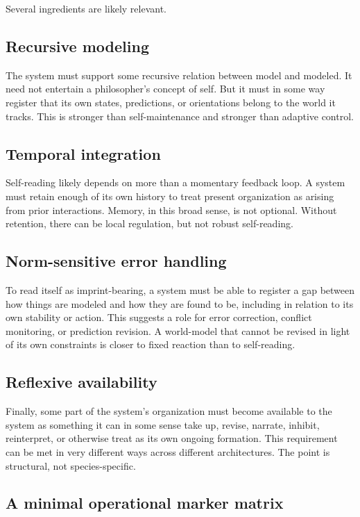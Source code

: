\documentclass[12pt]{article}
\begin{document}
Several ingredients are likely relevant.

\subsection{Recursive modeling}

The system must support some recursive relation between model and modeled. It need not entertain a philosopher's concept of self. But it must in some way register that its own states, predictions, or orientations belong to the world it tracks. This is stronger than self-maintenance and stronger than adaptive control.

\subsection{Temporal integration}

Self-reading likely depends on more than a momentary feedback loop. A system must retain enough of its own history to treat present organization as arising from prior interactions. Memory, in this broad sense, is not optional. Without retention, there can be local regulation, but not robust self-reading.

\subsection{Norm-sensitive error handling}

To read itself as imprint-bearing, a system must be able to register a gap between how things are modeled and how they are found to be, including in relation to its own stability or action. This suggests a role for error correction, conflict monitoring, or prediction revision. A world-model that cannot be revised in light of its own constraints is closer to fixed reaction than to self-reading.

\subsection{Reflexive availability}

Finally, some part of the system's organization must become available to the system as something it can in some sense take up, revise, narrate, inhibit, reinterpret, or otherwise treat as its own ongoing formation. This requirement can be met in very different ways across different architectures. The point is structural, not species-specific.

\subsection{A minimal operational marker matrix}
\end{document}

